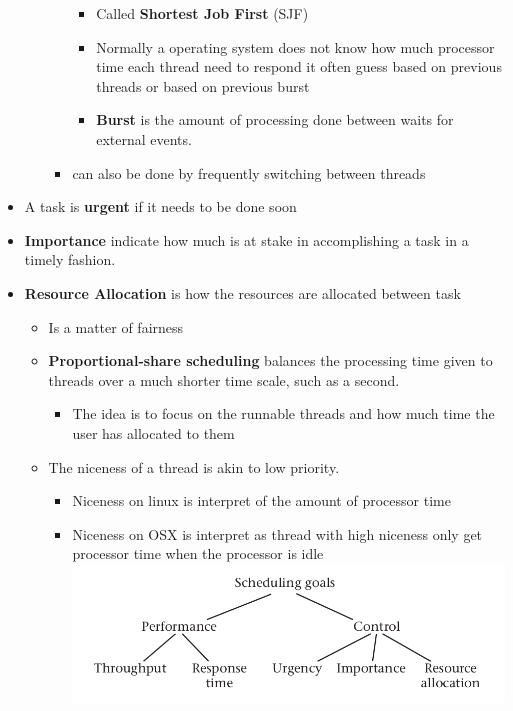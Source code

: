 \documentclass[11pt]{article}
\makeatletter
\def\maxwidth{\ifdim\Gin@nat@width>\linewidth\linewidth
    \else\Gin@nat@width\fi}
\let\Oldincludegraphics\includegraphics
\renewcommand{\includegraphics}[1]{\Oldincludegraphics[width=.8\maxwidth]{#1}}
\providecommand{\tightlist}{%
      \setlength{\itemsep}{0pt}\setlength{\parskip}{0pt}}
\makeatother
\begin{document}
\begin{itemize}
\begin{itemize}
\begin{itemize}
      \begin{itemize}
      \tightlist
      \item
        Called \textbf{Shortest Job First} (SJF)
      \item
        Normally a operating system does not know how much processor
        time each thread need to respond it often guess based on
        previous threads or based on previous burst
      \item
        \textbf{Burst} is the amount of processing done between waits
        for external events.
      \end{itemize}
    \item
      can also be done by frequently switching between threads
    \end{itemize}
  \end{itemize}
\item
  A task is \textbf{urgent} if it needs to be done soon
\item
  \textbf{Importance} indicate how much is at stake in accomplishing a
  task in a timely fashion.
\item
  \textbf{Resource Allocation} is how the resources are allocated
  between task

  \begin{itemize}
  \tightlist
  \item
    Is a matter of fairness
  \item
    \textbf{Proportional-share scheduling} balances the processing time
    given to threads over a much shorter time scale, such as a second.

    \begin{itemize}
    \tightlist
    \item
      The idea is to focus on the runnable threads and how much time the
      user has allocated to them
    \end{itemize}
  \item
    The niceness of a thread is akin to low priority.

    \begin{itemize}
    \tightlist
    \item
      Niceness on linux is interpret of the amount of processor time
    \item
      Niceness on OSX is interpret as thread with high niceness only get
      processor time when the processor is idle
      \includegraphics{img/scheduling_goals.png}
    \end{itemize}
  \end{itemize}
\end{itemize}
\end{document}
